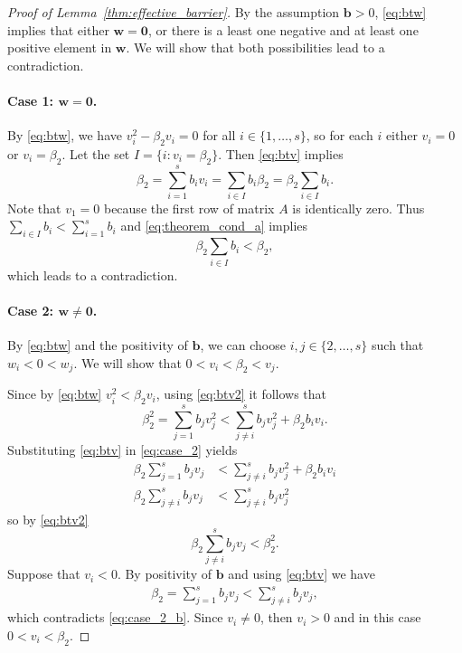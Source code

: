 \begin{proof}[Proof of Lemma~\ref{thm:effective_barrier}]
	By the assumption $\bm{b}>0$, \eqref{eq:btw} implies that either
	$\bm{w} = \bm{0}$, or there is a least one negative and at least one positive 
	element in $\bm{w}$.
	We will show that both possibilities lead to a contradiction.

	\paragraph{Case 1: $\bm{w} = \bm{0}$.}
	By \eqref{eq:btw}, we have $v_i^2 - \beta_2 v_i = 0$ for all $i \in \{1, \dots, s\}$, 
	so for each $i$ either $v_i = 0$ or $v_i = \beta_2$.
	Let the set $I = \{i : v_i = \beta_2\}$. 
	Then \eqref{eq:btv} implies 
	\begin{equation*}
		\beta_2 = \sum_{i=1}^s b_i v_i = \sum_{i \in I}b_i\beta_2 = \beta_2\sum_{i \in I}b_i.
	\end{equation*}
	Note that $v_1 = 0$ because the first row of matrix $A$ is identically zero. 
	Thus $\sum_{i\in I}b_i < \sum_{i=1}^s b_i$ and \eqref{eq:theorem_cond_a} 
	implies
	\begin{equation*}
		\beta_2\sum_{i \in I}b_i< \beta_2,
	\end{equation*} 
	which leads to a contradiction.

	\paragraph{Case 2: $\bm{w} \neq \bm{0}$.}
	By \eqref{eq:btw} and the positivity of $\bm{b}$, we can choose
	$i, j \in \{2, \dots, s\}$ such that $w_i < 0 < w_j$.
	We will show that $0 < v_i < \beta_2 < v_j$.

    Since by \eqref{eq:btw} $v_i^2 < \beta_2 v_i$, using \eqref{eq:btv2} it follows that
    \begin{equation}\label{eq:case_2}
    		\beta_2^2 = \sum_{j=1}^s b_j v_j^2 < \sum_{j \neq i}^s b_j v_j^2 + \beta_2 b_i v_i.
    	\end{equation}
    	Substituting \eqref{eq:btv} in \eqref{eq:case_2} yields
    	\begin{align*}
    		\beta_2\sum_{j=1}^s b_j v_j &< \sum_{j \neq i}^s b_j v_j^2 + \beta_2 b_i v_i \\
    		\beta_2\sum_{j \neq i}^s b_j v_j &< \sum_{j \neq i}^s b_j v_j^2 
    	\end{align*}
    	so by \eqref{eq:btv2}
    	\begin{equation}\label{eq:case_2_b}
            \beta_2\sum_{j \neq i}^s b_j v_j < \beta_2^2.
    \end{equation}
    Suppose that $v_{i} < 0$. By positivity of $\bm{b}$ and using \eqref{eq:btv} we have
    \begin{align*}
    		\beta_2 = \sum_{j=1}^s b_j v_j < \sum_{j \neq i}^s b_j v_j,
    	\end{align*}
    	which contradicts \eqref{eq:case_2_b}. 
    	Since $v_i \neq 0$, then $v_i > 0$ and in this case $0 < v_i < \beta_2$.
    	

\end{proof}
